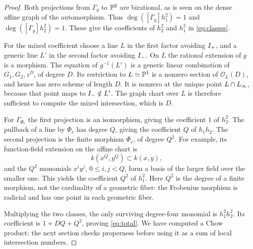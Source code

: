 \begin{proof}
Both projections from $\Gamma_g$ to $\mathbb P^2$ are birational, as is seen
on the dense affine graph of the automorphism. Thus
$\deg([\Gamma_g]h_1^2)=1$ and
$\deg([\Gamma_g]h_2^2)=1$. These give the coefficients of $h_2^2$
and $h_1^2$ in \eqref{eq:classes}.

For the mixed coefficient choose a line $L$ in the first factor avoiding
$I_{+}$, and a generic line $L'$ in the second factor avoiding $I_{-}$.
On $L$ the rational extension of $g$ is a morphism. The equation of
$g^{-1}(L')$ is a generic linear combination of $G_1,G_2,z^D$, of degree
$D$. Its restriction to $L\simeq\mathbb P^1$ is a nonzero section of
$\mathcal O_L(D)$, and hence has zero scheme of length $D$. It is nonzero
at the unique point $L\cap L_{\infty}$, because that point maps to
$I_{-}\notin L'$. The graph chart over $L$ is therefore sufficient to
compute the mixed intersection, which is $D$.

For $\Gamma_{\Phi_r}$ the first projection is an isomorphism, giving
the coefficient $1$ of $h_2^2$. The pullback of a line by $\Phi_r$ has
degree $Q$, giving the coefficient $Q$ of $h_1h_2$. The second projection
is the finite morphism $\Phi_r$, of degree $Q^2$. For example, its
function-field extension on the affine chart is
\[
 k(x^Q,y^Q)\subset k(x,y),
\]
and the $Q^2$ monomials $x^iy^j$, $0\leq i,j<Q$, form a basis of the
larger field over the smaller one. This yields the coefficient $Q^2$
of $h_1^2$. Here $Q^2$ is the degree of a finite morphism, not the
cardinality of a geometric fiber: the Frobenius morphism is radicial
and has one point in each geometric fiber.

Multiplying the two classes, the only surviving degree-four monomial
is $h_1^2h_2^2$. Its coefficient is $1+DQ+Q^2$, proving
\eqref{eq:total}. We have computed a Chow product; the next section
checks properness before using it as a sum of local intersection numbers.
\end{proof}

